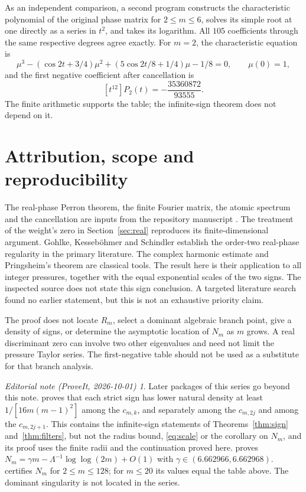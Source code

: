 \documentclass[11pt,a4paper]{article}
\theoremstyle{remark}\newtheorem*{ednote}{Editorial note (ProveIt, 2026-10-01)}
\begin{document}
As an independent comparison, a second program constructs the characteristic polynomial of the original phase matrix for $2\le m\le6$, solves its simple root at one directly as a series in $t^2$, and takes its logarithm.
All $105$ coefficients through the same respective degrees agree exactly.
For $m=2$, the characteristic equation is
\[
 \mu^3-(\cos2t+3/4)\mu^2+(5\cos2t/8+1/4)\mu-1/8=0,
 \qquad \mu(0)=1,
\]
and the first negative coefficient after cancellation is
\[
 [t^{12}]P_2(t)=-\frac{35360872}{93555}.
\]
The finite arithmetic supports the table; the infinite-sign theorem does not depend on it.

\section{Attribution, scope and reproducibility}
The real-phase Perron theorem, the finite Fourier matrix, the atomic spectrum and the cancellation are inputs from the repository manuscript \cite{Repo}.
The treatment of the weight's zero in Section~\ref{sec:real} reproduces its finite-dimensional argument.
Gohlke, Kesseb\"ohmer and Schindler \cite[Theorem 2.7]{GKS} establish the order-two real-phase regularity in the primary literature.
The complex harmonic estimate and Pringsheim's theorem are classical tools.
The result here is their application to all integer pressures, together with the equal exponential scales of the two signs.
The inspected source does not state this sign conclusion.
A targeted literature search found no earlier statement, but this is not an exhaustive priority claim.

The proof does not locate $R_m$, select a dominant algebraic branch point, give a density of signs, or determine the asymptotic location of $N_m$ as $m$ grows.
A real discriminant zero can involve two other eigenvalues and need not limit the pressure Taylor series.
The first-negative table should not be used as a substitute for that branch analysis.
\begin{ednote}
Later packages of this series go beyond this note.  proves that
each strict sign has lower natural density at least $1/[16m(m-1)^2]$ among the $c_{m,k}$, and
separately among the $c_{m,2j}$ and among the $c_{m,2j+1}$. This contains the infinite-sign
statements of Theorems~\ref{thm:sign} and~\ref{thm:filters}, but not the radius bound,
\eqref{eq:scale} or the corollary on $N_m$, and its proof uses the finite radii and the
continuation proved here.  proves $N_m=\gamma m-\Lambda^{-1}\log\log(2m)+O(1)$ with $\gamma\in(6.662966,6.662968)$.
 certifies $N_m$ for $2\le m\le128$; for $m\le20$ its values
equal the table above. The dominant singularity is not located in the series.
\end{ednote}
\end{document}
